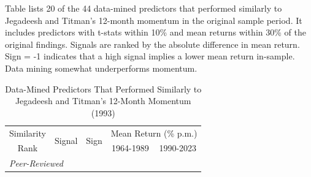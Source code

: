 \begin{table}[p]
\caption{Data-Mined Predictors That Performed Similarly to Jegadeesh and Titman's
12-Month Momentum (1993) }
\label{tab:closer_mom12m}

\begin{singlespace}
\noindent Table lists 20 of the 44 data-mined predictors that performed similarly to Jegadeesh and Titman's \citeyearpar{jegadeesh1993returns} 12-month momentum in the original sample period. It includes predictors with t-stats within 10\% and mean returns within 30\% of the original findings. Signals are ranked by the absolute difference in mean return. Sign = -1 indicates that a high signal implies a lower mean return in-sample. Data mining somewhat underperforms  momentum.
\end{singlespace}
\begin{centering}
\vspace{0ex}
\par\end{centering}
\centering{}\setlength{\tabcolsep}{0.5ex} \small
\begin{center}
\begin{tabular}{rlrrr} \toprule 
\multicolumn{1}{c}{Similarity} 
    & \multirow{2}[2]{*}{Signal} 
    & \multicolumn{1}{l}{\multirow{2}[2]{*}{Sign}} & \multicolumn{2}{c}{Mean Return (\% p.m.)} \\   
\multicolumn{1}{c}{Rank}  &  &   & \multicolumn{1}{c}{1964-1989} & \multicolumn{1}{c}{1990-2023} \\ 
\midrule 
\multicolumn{5}{l}{\textit{Peer-Reviewed}} \\ 
\midrule   

\bottomrule 
\end{tabular}%
\end{center} 
\end{table}


